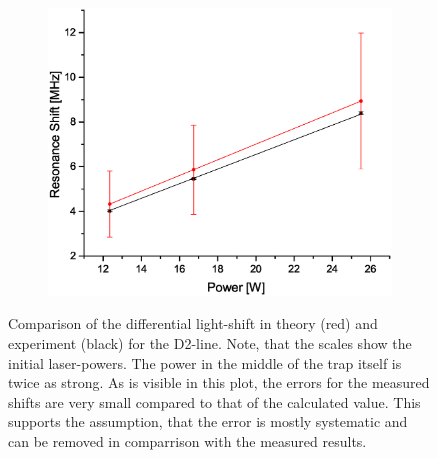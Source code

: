 \begin{figure}[H]
\centering
\begin{subfigure}[b]{0.8\textwidth}
                \includegraphics[width=\textwidth]{Shift2}
\end{subfigure}
\caption{Comparison of the differential light-shift in theory (red) and experiment (black) for the D2-line. Note, that the scales show the initial laser-powers. The power in the middle of the trap itself is twice as strong. As is visible in this plot, the errors for the measured shifts are very small compared to that of the calculated value. This supports the assumption, that the error is mostly systematic and can be removed in comparrison with the measured results.}
\label{shifts}
\end{figure}

